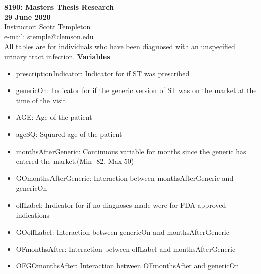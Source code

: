 
\let\counterwithout\relax
\let\counterwithin\relax
{}



\noindent \textbf{8190: Masters Thesis Research}\\
\noindent \textbf{29 June 2020}\\
\noindent Instructor: Scott Templeton \\
e-mail: stemple@clemson.edu\\

\noindent All tables are for individuals who have been diagnosed with an unspecified urinary tract infection. 
\noindent \textbf{Variables}\\
\begin{itemize}
    \item prescriptionIndicator: Indicator for if ST was prescribed
    \item genericOn: Indicator for if the generic version of ST was on the market at the time of the visit
    \item AGE: Age of the patient
    \item ageSQ: Squared age of the patient
    \item monthsAfterGeneric: Continuous variable for months since the generic has entered the market.(Min -82, Max 50)
    \item GOmonthsAfterGeneric: Interaction between monthsAfterGeneric and genericOn
    \item offLabel: Indicator for if no diagnoses made were for FDA approved indications
    \item GOoffLabel: Interaction between genericOn and monthsAfterGeneric
    \item OFmonthsAfter: Interaction between offLabel and monthsAfterGeneric
    \item OFGOmonthsAfter: Interaction between OFmonthsAfter and genericOn
\end{itemize}
\begin{landscape}

\newpage

\newpage

\newpage

\newpage

\newpage

\newpage

\end{landscape}




